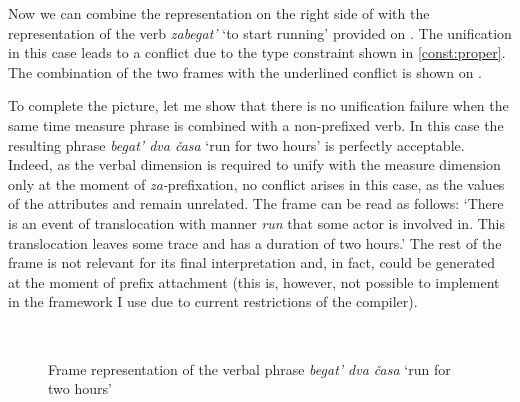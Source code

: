 Now we can combine the representation on the right side of  with the representation of the verb \textit{zabegat'} `to start running' provided on . The unification in this case leads to a conflict due to the type constraint shown in \ref{const:proper}. The combination of the two frames with the underlined conflict is shown on . 

To complete the picture, let me show that there is no unification failure when the same time measure phrase is combined with a non-prefixed verb. In this case the resulting phrase \textit{begat' dva \v{c}asa} `run for two hours' is perfectly acceptable. Indeed, as the verbal dimension is required to unify with the measure dimension only at the moment of \textit{za-}prefixation, no conflict arises in this case, as the values of the attributes \MDIM and \VERBDIM remain unrelated. The frame can be read as follows: `There is an event of translocation with manner \textit{run} that some actor is involved in. This translocation leaves some trace and has a duration of two hours.' The rest of the frame is not relevant for its final interpretation and, in fact, could be generated at the moment of prefix attachment (this is, however, not possible to implement in the framework I use due to current restrictions of the compiler).

\begin{figure}
\centering
{}\\
\caption{Frame representation of the verbal phrase \textit{begat' dva \v{c}asa} `run for two hours' \label{frame:begat:2hours}}
\end{figure}

